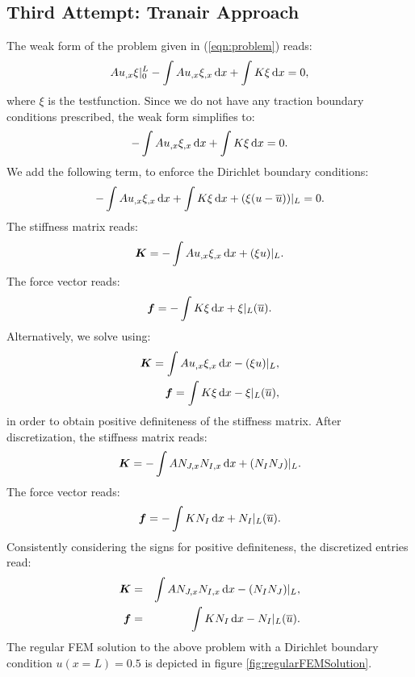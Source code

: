 \documentclass[a4paper,12pt]{article}
\newcommand{\mb}[1]{{\mbox{\boldmath$#1$\unboldmath}}}
\newcommand{\intd}{\,{\rm d}}
\begin{document}
\subsection{Third Attempt: Tranair Approach}
The weak form of the problem given in (\ref{eqn:problem}) reads:
\begin{equation*}
Au_{,x}\xi\vert_0^L - \int Au_{,x}\xi_{,x}\intd x + \int K \xi \intd x= 0,
\end{equation*}
where $\xi$ is the testfunction. 
Since we do not have any traction boundary conditions prescribed, the weak form simplifies to:
\begin{equation*}
- \int Au_{,x}\xi_{,x}\intd x + \int K \xi \intd x= 0.
\end{equation*}
We add the following term, to enforce the Dirichlet boundary conditions:
\begin{equation*}
- \int Au_{,x}\xi_{,x}\intd x + \int K \xi \intd x +  (\xi(u-\overline{u}))\vert_{L}= 0.
\end{equation*}
The stiffness matrix reads:
\begin{equation*}
\mb{K} = - \int Au_{,x}\xi_{,x}\intd x+  (\xi u)\vert_{L}.
\end{equation*}
The force vector reads:
\begin{equation*}
\mb{f} = - \int K \xi \intd x +  \xi\vert_{L}(\overline{u}).
\end{equation*}
Alternatively, we solve using:
\begin{eqnarray*}
\mb{K} =  \int Au_{,x}\xi_{,x}\intd x -  (\xi u)\vert_{L},\\
\mb{f} = \int K \xi \intd x - \xi\vert_{L}(\overline{u}),
\end{eqnarray*}
in order to obtain positive definiteness of the stiffness matrix.
After discretization, the stiffness matrix reads:
\begin{equation*}
\mb{K} = - \int AN_{J,x}N_{I,x}\intd x + (N_I N_J)\vert_{L}.
\end{equation*}
The force vector reads:
\begin{equation*}
\mb{f} = - \int K N_I \intd x +  N_I\vert_{L}(\overline{u}).
\end{equation*}
Consistently considering the signs for positive definiteness, the discretized entries read:
\begin{eqnarray*}
\mb{K} &=&  \int AN_{J,x}N_{I,x}\intd x - (N_I N_J)\vert_{L},\\
\mb{f} &=&  \int K N_I \intd x -  N_I\vert_{L}(\overline{u}).
\end{eqnarray*}
The regular FEM solution to the above problem with a Dirichlet boundary condition $u(x=L) = 0.5$  is depicted in figure \ref{fig:regularFEMSolution}.
\end{document}
